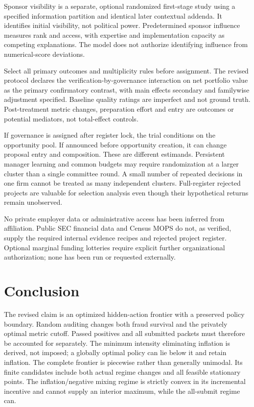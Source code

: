 \documentclass[11pt]{article}
\begin{document}
Sponsor visibility is a separate, optional randomized first-stage study using a specified information partition and identical later contextual addenda. It identifies initial visibility, not political power. Predetermined sponsor influence measures rank and access, with expertise and implementation capacity as competing explanations. The model does not authorize identifying influence from numerical-score deviations.

Select all primary outcomes and multiplicity rules before assignment. The revised protocol declares the verification-by-governance interaction on net portfolio value as the primary confirmatory contrast, with main effects secondary and familywise adjustment specified. Baseline quality ratings are imperfect and not ground truth. Post-treatment metric changes, preparation effort and entry are outcomes or potential mediators, not total-effect controls.

If governance is assigned after register lock, the trial conditions on the opportunity pool. If announced before opportunity creation, it can change proposal entry and composition. These are different estimands. Persistent manager learning and common budgets may require randomization at a larger cluster than a single committee round. A small number of repeated decisions in one firm cannot be treated as many independent clusters. Full-register rejected projects are valuable for selection analysis even though their hypothetical returns remain unobserved.

No private employer data or administrative access has been inferred from affiliation. Public SEC financial data and Census MOPS do not, as verified, supply the required internal evidence recipes and rejected project register. Optional marginal funding lotteries require explicit further organizational authorization; none has been run or requested externally.

\section{Conclusion}\label{sec:limits}
The revised claim is an optimized hidden-action frontier with a preserved policy boundary. Random auditing changes both fraud survival and the privately optimal metric cutoff. Passed positives and all submitted packets must therefore be accounted for separately. The minimum intensity eliminating inflation is derived, not imposed; a globally optimal policy can lie below it and retain inflation. The complete frontier is piecewise rather than generally unimodal. Its finite candidates include both actual regime changes and all feasible stationary points. The inflation/negative mixing regime is strictly convex in its incremental incentive and cannot supply an interior maximum, while the all-submit regime can.
\end{document}
